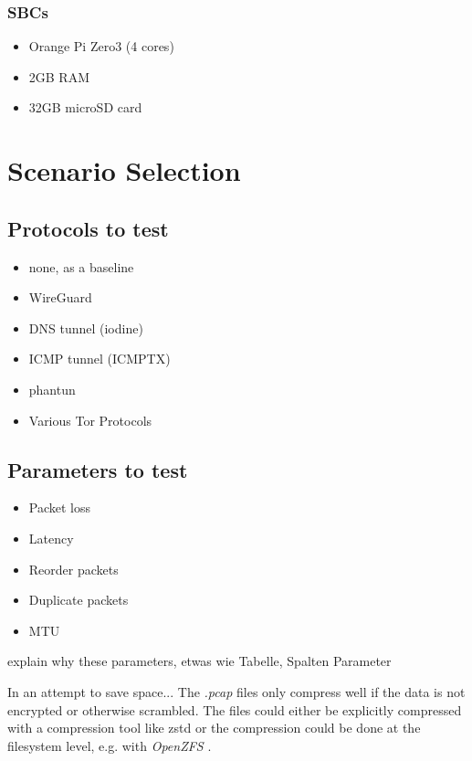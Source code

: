 \subsubsection{SBCs}
\begin{itemize}
  \item Orange Pi Zero3 (4 cores)
  \item 2GB RAM
  \item 32GB microSD card
\end{itemize}

\section{Scenario Selection}
\subsection{Protocols to test}
\begin{itemize}
  \item none, as a baseline
  \item WireGuard
  \item DNS tunnel (iodine)
  \item ICMP tunnel (ICMPTX)
  \item phantun
  \item Various Tor Protocols
\end{itemize}


\subsection{Parameters to test}
\begin{itemize}
  \item Packet loss
  \item Latency
  \item Reorder packets
  \item Duplicate packets
  \item MTU
\end{itemize}
explain why these parameters, etwas wie Tabelle, Spalten Parameter







In an attempt to save space...
The \textit{.pcap} \cite{wiki:Pcap} files only compress well if the data is not encrypted or otherwise scrambled.
The files could either be explicitly compressed with a compression tool like zstd or the compression could be done at the filesystem level, e.g. with \textit{OpenZFS} \cite{OpenZFS}. 


